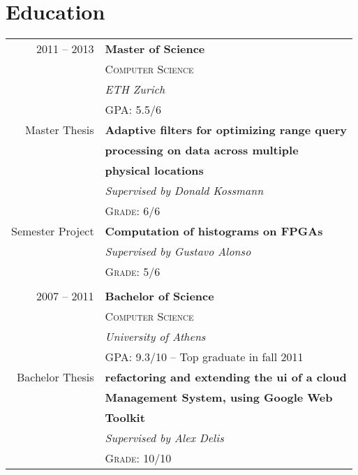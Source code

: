 \documentclass[10pt]{article} %
\begin{document}
\begin{minipage}[t]{0.5\textwidth} %
\vspace{0pt} %
	



\section{Education} 

\begin{tabular}{rl} %



2011 -- 2013 & \textbf{Master of Science} \\ 
& \textsc{Computer Science} \\ 
& \textit{ETH Zurich}\\
 \small  & GPA: 5.5/6 \\
Master Thesis
& \textbf{Adaptive filters for optimizing range query}\\
& \textbf{processing on data across multiple}\\
& \textbf{physical locations}\\
& \textit{Supervised by Donald Kossmann}\\
& \textsc{Grade: 6/6}\\
Semester Project
& \textbf{Computation of histograms on FPGAs}\\
& \textit{Supervised by Gustavo Alonso}\\
& \textsc{Grade: 5/6}\\
&\\
	 


2007 -- 2011 & \textbf{Bachelor of Science}\\
& \textsc{Computer Science} \\
& \textit{University of Athens} \\
\small  & GPA: 9.3/10 -- Top graduate in fall 2011\\
Bachelor Thesis
& \textbf{refactoring and extending the ui of a cloud}\\
& \textbf{Management System, using Google Web}\\
& \textbf{Toolkit}\\
& \textit{Supervised by Alex Delis}\\
& \textsc{Grade: 10/10}\\
	

\end{tabular}
\end{minipage}
\end{document}
